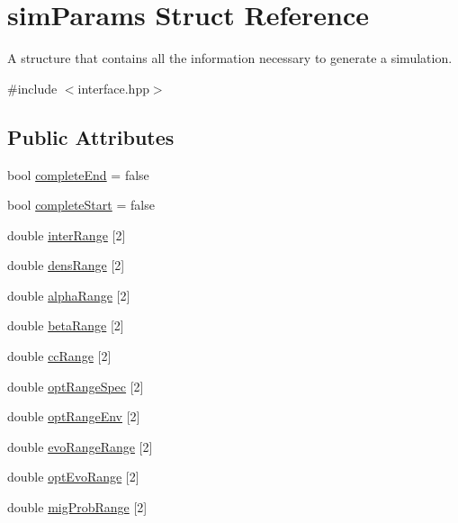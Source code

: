 \hypertarget{structsimParams}{}\section{sim\+Params Struct Reference}
\label{structsimParams}


A structure that contains all the information necessary to generate a simulation.  




{\ttfamily \#include $<$interface.\+hpp$>$}

\subsection*{Public Attributes}
\begin{DoxyCompactItemize}
\item 
bool \hyperlink{structsimParams_a7b06eae32b1691cb52bfc4a7e135f589}{complete\+End} = false
\item 
bool \hyperlink{structsimParams_ad96e572c78fc800e13936b937f3addca}{complete\+Start} = false
\item 
double \hyperlink{structsimParams_a459d8e2a902ef06f2e6ccce91a5f40bc}{inter\+Range} \mbox{[}2\mbox{]}
\item 
double \hyperlink{structsimParams_a48b3258fb2eabaf36a4392a3be846366}{dens\+Range} \mbox{[}2\mbox{]}
\item 
double \hyperlink{structsimParams_a2674f228bf6b33bf35dc6d1cfb6befba}{alpha\+Range} \mbox{[}2\mbox{]}
\item 
double \hyperlink{structsimParams_a676b73cd7d60743090c9f2b4c166c083}{beta\+Range} \mbox{[}2\mbox{]}
\item 
double \hyperlink{structsimParams_a730247ea2898e90b85dd99c55d8a18e3}{cc\+Range} \mbox{[}2\mbox{]}
\item 
double \hyperlink{structsimParams_a169d5e6c66da8b477bb7e384fe4c90b8}{opt\+Range\+Spec} \mbox{[}2\mbox{]}
\item 
double \hyperlink{structsimParams_ab59d469330753aebd7ce7ab893a6eda4}{opt\+Range\+Env} \mbox{[}2\mbox{]}
\item 
double \hyperlink{structsimParams_a328c95295bd7872174fa9a22c9c402cd}{evo\+Range\+Range} \mbox{[}2\mbox{]}
\item 
double \hyperlink{structsimParams_a2822e99362ed71f123e812a8fd9ad443}{opt\+Evo\+Range} \mbox{[}2\mbox{]}
\item 
double \hyperlink{structsimParams_a4a67c773b31598604c56efc130a69945}{mig\+Prob\+Range} \mbox{[}2\mbox{]}

\end{DoxyCompactItemize}
